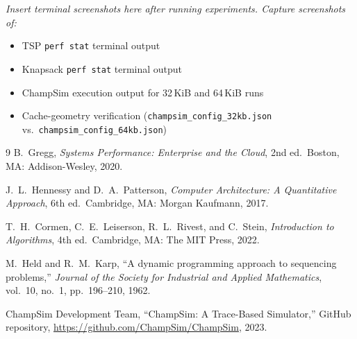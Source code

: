\documentclass[11pt,a4paper]{article}
\begin{document}
\textit{Insert terminal screenshots here after running experiments.  Capture
screenshots of:}
\begin{itemize}
    \item TSP \texttt{perf stat} terminal output
    \item Knapsack \texttt{perf stat} terminal output
    \item ChampSim execution output for 32\,KiB and 64\,KiB runs
    \item Cache-geometry verification (\texttt{champsim\_config\_32kb.json}
          vs.\ \texttt{champsim\_config\_64kb.json})
\end{itemize}

\begin{thebibliography}{9}
B.\ Gregg, \textit{Systems Performance: Enterprise and the Cloud}, 2nd ed.\
Boston, MA: Addison-Wesley, 2020.

J.\ L.\ Hennessy and D.\ A.\ Patterson,
\textit{Computer Architecture: A Quantitative Approach}, 6th ed.\
Cambridge, MA: Morgan Kaufmann, 2017.

T.\ H.\ Cormen, C.\ E.\ Leiserson, R.\ L.\ Rivest, and C.\ Stein,
\textit{Introduction to Algorithms}, 4th ed.\
Cambridge, MA: The MIT Press, 2022.

\bibitem{held1962}
M.\ Held and R.\ M.\ Karp,
``A dynamic programming approach to sequencing problems,''
\textit{Journal of the Society for Industrial and Applied Mathematics},
vol.\ 10, no.\ 1, pp.\ 196--210, 1962.

\bibitem{champsim}
ChampSim Development Team, ``ChampSim: A Trace-Based Simulator,''
GitHub repository, \url{https://github.com/ChampSim/ChampSim}, 2023.
\end{thebibliography}
\end{document}
